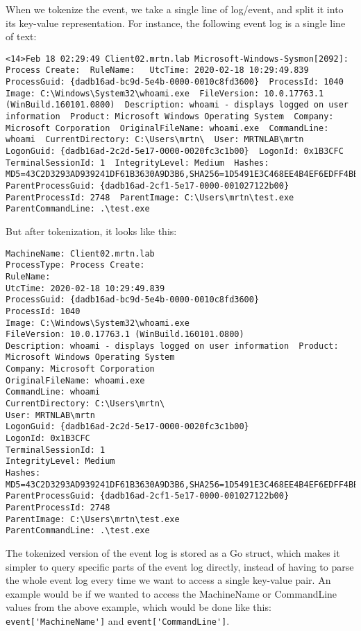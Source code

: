 When we tokenize the event, we take a single line of log/event, and split it into its key-value representation. For instance, the following event log is a single line of text:
\begin{lstlisting}[breaklines=true]
<14>Feb 18 02:29:49 Client02.mrtn.lab Microsoft-Windows-Sysmon[2092]: Process Create:  RuleName:   UtcTime: 2020-02-18 10:29:49.839  ProcessGuid: {dadb16ad-bc9d-5e4b-0000-0010c8fd3600}  ProcessId: 1040  Image: C:\Windows\System32\whoami.exe  FileVersion: 10.0.17763.1 (WinBuild.160101.0800)  Description: whoami - displays logged on user information  Product: Microsoft Windows Operating System  Company: Microsoft Corporation  OriginalFileName: whoami.exe  CommandLine: whoami  CurrentDirectory: C:\Users\mrtn\  User: MRTNLAB\mrtn  LogonGuid: {dadb16ad-2c2d-5e17-0000-0020fc3c1b00}  LogonId: 0x1B3CFC  TerminalSessionId: 1  IntegrityLevel: Medium  Hashes: MD5=43C2D3293AD939241DF61B3630A9D3B6,SHA256=1D5491E3C468EE4B4EF6EDFF4BBC7D06EE83180F6F0B1576763EA2EFE049493A,IMPHASH=7FF0758B766F747CE57DFAC70743FB88  ParentProcessGuid: {dadb16ad-2cf1-5e17-0000-001027122b00}  ParentProcessId: 2748  ParentImage: C:\Users\mrtn\test.exe  ParentCommandLine: .\test.exe
\end{lstlisting}
But after tokenization, it looks like this:
\begin{lstlisting}[breaklines=true]
MachineName: Client02.mrtn.lab
ProcessType: Process Create: 
RuleName:   
UtcTime: 2020-02-18 10:29:49.839
ProcessGuid: {dadb16ad-bc9d-5e4b-0000-0010c8fd3600}
ProcessId: 1040
Image: C:\Windows\System32\whoami.exe
FileVersion: 10.0.17763.1 (WinBuild.160101.0800)
Description: whoami - displays logged on user information  Product: Microsoft Windows Operating System
Company: Microsoft Corporation 
OriginalFileName: whoami.exe
CommandLine: whoami
CurrentDirectory: C:\Users\mrtn\
User: MRTNLAB\mrtn
LogonGuid: {dadb16ad-2c2d-5e17-0000-0020fc3c1b00}
LogonId: 0x1B3CFC
TerminalSessionId: 1
IntegrityLevel: Medium
Hashes: MD5=43C2D3293AD939241DF61B3630A9D3B6,SHA256=1D5491E3C468EE4B4EF6EDFF4BBC7D06EE83180F6F0B1576763EA2EFE049493A,IMPHASH=7FF0758B766F747CE57DFAC70743FB88
ParentProcessGuid: {dadb16ad-2cf1-5e17-0000-001027122b00}
ParentProcessId: 2748
ParentImage: C:\Users\mrtn\test.exe
ParentCommandLine: .\test.exe
\end{lstlisting}
The tokenized version of the event log is stored as a Go struct, which makes it simpler to query specific parts of the event log directly, instead of having to parse the whole event log every time we want to access a single key-value pair. An example would be if we wanted to access the MachineName or CommandLine values from the above example, which would be done like this:  \lstinline{event['MachineName']} and \lstinline{event['CommandLine']}.


